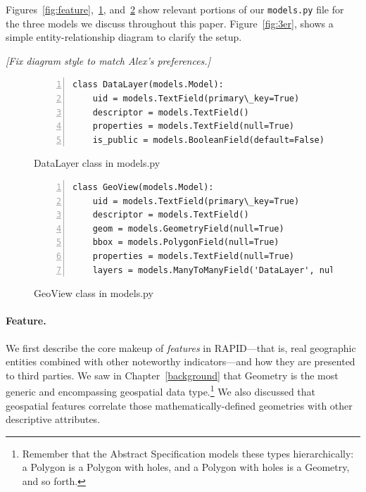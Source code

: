 Figures~\ref{fig:feature},~\ref{fig:datalayer}, and~\ref{fig:geoview} show relevant portions of our \texttt{models.py} file for the three models we discuss throughout this paper. Figure~\ref{fig:3er}, shows a simple entity-relationship diagram to clarify the setup. 

\textit{[Fix diagram style to match Alex's preferences.]}


\begin{figure}[ht]
\begin{Verbatim}[samepage=true,baselinestretch=1,numbers=left,xleftmargin=12mm]
class DataLayer(models.Model):
    uid = models.TextField(primary\_key=True)
    descriptor = models.TextField()
    properties = models.TextField(null=True)
    is_public = models.BooleanField(default=False)
\end{Verbatim}
\caption{DataLayer class in models.py}
\label{fig:datalayer}
\end{figure}

\begin{figure}[ht]
\begin{Verbatim}[samepage=true,baselinestretch=1,numbers=left,xleftmargin=12mm]
class GeoView(models.Model):
    uid = models.TextField(primary\_key=True)
    descriptor = models.TextField()
    geom = models.GeometryField(null=True)
    bbox = models.PolygonField(null=True)
    properties = models.TextField(null=True)
    layers = models.ManyToManyField('DataLayer', null=True)
\end{Verbatim}
\caption{GeoView class in models.py}
\label{fig:geoview}
\end{figure}

\paragraph{Feature.}
We first describe the core makeup of \textit{features} in RAPID---that is, real geographic entities combined with other noteworthy indicators---and how they are presented to third parties. We saw in Chapter~\ref{background} that Geometry is the most generic and encompassing geospatial data type.\footnote{Remember that the Abstract Specification models these types hierarchically: a Polygon is a Polygon with holes, and a Polygon with holes is a Geometry, and so forth.} We also discussed that geospatial features correlate those mathematically-defined geometries with other descriptive attributes.

